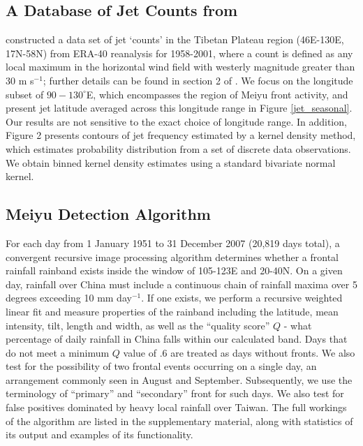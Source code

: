 \documentclass[draft,grl]{AGUTeX}
\begin{document}
\begin{article}
\subsection{A Database of Jet Counts from \citet{Schiemann2009}} 

	\citet{Schiemann2009} constructed a data set of jet `counts' in the Tibetan Plateau region (46\textdegree E-130\textdegree E, 17\textdegree N-58\textdegree N) from ERA-40 reanalysis for 1958-2001, where a count is defined as any local maximum in the horizontal wind field with westerly magnitude greater than $30$ m s$^{-1}$; further details can be found in section 2 of \citet{Schiemann2009}. We focus on the longitude subset of $90-130^\circ$E, which encompasses the region of Meiyu front activity, and present jet latitude averaged across this longitude range in Figure \ref{jet_seasonal}. Our results are not sensitive to the exact choice of longitude range. In addition, Figure 2 presents contours of jet frequency estimated by a kernel density method, which estimates probability distribution from a set of discrete data observations. We obtain binned kernel density estimates using a standard bivariate normal kernel. 
	
\subsection{Meiyu Detection Algorithm}

	For each day from 1 January 1951 to 31 December 2007 (20,819 days total), a convergent recursive image processing algorithm determines whether a frontal rainfall rainband exists inside the window of 105-123E and 20-40N. On a given day, rainfall over China must include a continuous chain of rainfall maxima over 5 degrees exceeding 10 mm day$^{-1}$. If one exists, we perform a recursive weighted linear fit and measure properties of the rainband including the latitude, mean intensity, tilt, length and width, as well as the ``quality score'' $Q$ - what percentage of daily rainfall in China falls within our calculated band. Days that do not meet a minimum $Q$ value of .6 are treated as days without fronts. We also test for the possibility of two frontal events occurring on a single day, an arrangement commonly seen in August and September. Subsequently, we use the terminology of ``primary'' and ``secondary'' front for such days. We also test for false positives dominated by heavy local rainfall over Taiwan. The full workings of the algorithm are listed in the supplementary material, along with statistics of its output and examples of its functionality.


\end{article}
\end{document}
